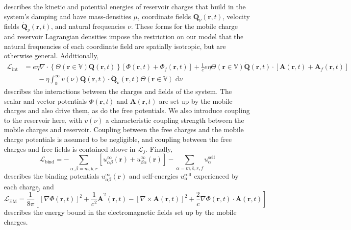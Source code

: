 \documentclass{article}
\begin{document}
describes the kinetic and potential energies of reservoir charges that build in the system's damping and have mass-densities $\mu$, coordinate fields $\mathbf{Q}_\nu(\mathbf{r},t)$, velocity fields $\dot{\mathbf{Q}}_\nu(\mathbf{r},t)$, and natural frequencies $\nu$. These forms for the mobile charge and reservoir Lagrangian densities impose the restriction on our model that the natural frequencies of each coordinate field are spatially isotropic, but are otherwise general. Additionally,
\begin{equation}
\begin{split}
\mathcal{L}_\mathrm{int} &= e\eta\nabla\cdot\left\{\Theta(\mathbf{r}\in\mathbb{V})\mathbf{Q}(\mathbf{r},t)\right\}\left[\Phi(\mathbf{r},t) + \Phi_f(\mathbf{r},t)\right] + \frac{1}{c}e\eta\Theta(\mathbf{r}\in\mathbb{V})\dot{\mathbf{Q}}(\mathbf{r},t)\cdot\left[\mathbf{A}(\mathbf{r},t) + \mathbf{A}_f(\mathbf{r},t)\right]\\
&\qquad- \eta\int_0^\infty  v(\nu)\mathbf{Q}(\mathbf{r},t)\cdot\dot{\mathbf{Q}}_\nu(\mathbf{r},t)\Theta(\mathbf{r}\in\mathbb{V})\;\mathrm{d}\nu
\end{split}
\end{equation}
describes the interactions between the charges and fields of the system. The scalar and vector potentials $\Phi(\mathbf{r},t)$ and $\mathbf{A}(\mathbf{r},t)$ are set up by the mobile charges and also drive them, as do the free potentials. We also introduce coupling to the reservoir here, with $ v(\nu)$ a characteristic coupling strength between the mobile charges and reservoir. Coupling between the free charges and the mobile charge potentials is assumed to be negligible, and coupling between the free charges and free fields is contained above in $\mathcal{L}_f$. Finally,
\begin{equation}
\mathcal{L}_\mathrm{bind} = -\sum_{\alpha,\beta = m,b,r}\left[u_{\alpha\beta}^\infty(\mathbf{r}) + u_{\beta\alpha}^\infty(\mathbf{r})\right] - \sum_{\alpha = m,b,r,f}u_\alpha^\mathrm{self}
\end{equation}
describes the binding potentials $u_{\alpha\beta}^\infty(\mathbf{r})$ and self-energies $u_\alpha^\mathrm{self}$ experienced by each charge, and
\begin{equation}
\mathcal{L}_\mathrm{EM} = \frac{1}{8\pi}\left[\left[\nabla\Phi(\mathbf{r},t)\right]^2 + \frac{1}{c^2}\dot{\mathbf{A}}^2(\mathbf{r},t) - \left[\nabla\times\mathbf{A}(\mathbf{r},t)\right]^2 + \frac{2}{c}\nabla\Phi(\mathbf{r},t)\cdot\dot{\mathbf{A}}(\mathbf{r},t)\right]
\end{equation}
describes the energy bound in the electromagnetic fields set up by the mobile charges. 
\end{document}
